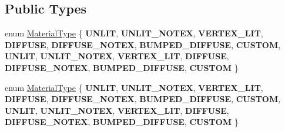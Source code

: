 \subsection*{Public Types}
\begin{DoxyCompactItemize}
\item 
enum \hyperlink{classSprite3DMaterial_a2b3cb11be78a5f6332cc01d5b7063e32}{Material\+Type} \{ \newline
{\bfseries U\+N\+L\+IT}, 
{\bfseries U\+N\+L\+I\+T\+\_\+\+N\+O\+T\+EX}, 
{\bfseries V\+E\+R\+T\+E\+X\+\_\+\+L\+IT}, 
{\bfseries D\+I\+F\+F\+U\+SE}, 
\newline
{\bfseries D\+I\+F\+F\+U\+S\+E\+\_\+\+N\+O\+T\+EX}, 
{\bfseries B\+U\+M\+P\+E\+D\+\_\+\+D\+I\+F\+F\+U\+SE}, 
{\bfseries C\+U\+S\+T\+OM}, 
{\bfseries U\+N\+L\+IT}, 
\newline
{\bfseries U\+N\+L\+I\+T\+\_\+\+N\+O\+T\+EX}, 
{\bfseries V\+E\+R\+T\+E\+X\+\_\+\+L\+IT}, 
{\bfseries D\+I\+F\+F\+U\+SE}, 
{\bfseries D\+I\+F\+F\+U\+S\+E\+\_\+\+N\+O\+T\+EX}, 
\newline
{\bfseries B\+U\+M\+P\+E\+D\+\_\+\+D\+I\+F\+F\+U\+SE}, 
{\bfseries C\+U\+S\+T\+OM}
 \}
\item 
enum \hyperlink{classSprite3DMaterial_a2b3cb11be78a5f6332cc01d5b7063e32}{Material\+Type} \{ \newline
{\bfseries U\+N\+L\+IT}, 
{\bfseries U\+N\+L\+I\+T\+\_\+\+N\+O\+T\+EX}, 
{\bfseries V\+E\+R\+T\+E\+X\+\_\+\+L\+IT}, 
{\bfseries D\+I\+F\+F\+U\+SE}, 
\newline
{\bfseries D\+I\+F\+F\+U\+S\+E\+\_\+\+N\+O\+T\+EX}, 
{\bfseries B\+U\+M\+P\+E\+D\+\_\+\+D\+I\+F\+F\+U\+SE}, 
{\bfseries C\+U\+S\+T\+OM}, 
{\bfseries U\+N\+L\+IT}, 
\newline
{\bfseries U\+N\+L\+I\+T\+\_\+\+N\+O\+T\+EX}, 
{\bfseries V\+E\+R\+T\+E\+X\+\_\+\+L\+IT}, 
{\bfseries D\+I\+F\+F\+U\+SE}, 
{\bfseries D\+I\+F\+F\+U\+S\+E\+\_\+\+N\+O\+T\+EX}, 
\newline
{\bfseries B\+U\+M\+P\+E\+D\+\_\+\+D\+I\+F\+F\+U\+SE}, 
{\bfseries C\+U\+S\+T\+OM}
 \}
\end{DoxyCompactItemize}
